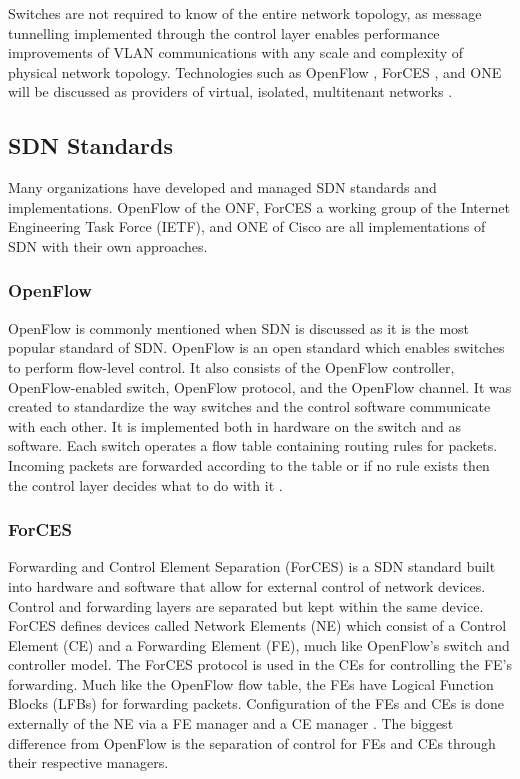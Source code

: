 \documentclass[12pt]{article}
\begin{document}
Switches are not required to know of the entire network topology, as message tunnelling implemented through the control layer enables performance improvements of VLAN communications with any scale and complexity of physical network topology. Technologies such as OpenFlow \cite{openflow}, ForCES \cite{forces}, and ONE \cite{ciscoone} will be discussed as providers of virtual, isolated, multitenant networks \cite{wang2015survey}.




\subsection{SDN Standards}

Many organizations have developed and managed SDN standards and implementations. OpenFlow \cite{openflow} of the ONF, ForCES \cite{forces} a working group of the Internet Engineering Task Force (IETF), and ONE \cite{ciscoone} of Cisco are all implementations of SDN with their own approaches.

\subsubsection{OpenFlow}

OpenFlow \cite{openflow} is commonly mentioned when SDN is discussed as it is the most popular standard of SDN. OpenFlow is an open standard which enables switches to perform flow-level control. It also consists of the OpenFlow controller, OpenFlow-enabled switch, OpenFlow protocol, and the OpenFlow channel. It was created to standardize the way switches and the control software communicate with each other. It is implemented  both in hardware on the switch and as software. Each switch operates a flow table containing routing rules for packets. Incoming packets are forwarded according to the table or if no rule exists then the control layer decides what to do with it \cite{wang2015survey}.

\subsubsection{ForCES}

Forwarding and Control Element Separation (ForCES) \cite{forces} is a SDN standard built into hardware and software that allow for external control of network devices. Control and forwarding layers are separated but kept within the same device. ForCES defines devices called Network Elements (NE) which consist of a Control Element (CE) and a Forwarding Element (FE), much like OpenFlow's switch and controller model. The ForCES protocol is used in the CEs for controlling the FE's forwarding. Much like the OpenFlow flow table, the FEs have Logical Function Blocks (LFBs) for forwarding packets. Configuration of the FEs and CEs is done externally of the NE via a FE manager and a CE manager \cite{wang2015survey}. The biggest difference from OpenFlow is the separation of control for FEs and CEs through their respective managers.
\end{document}
